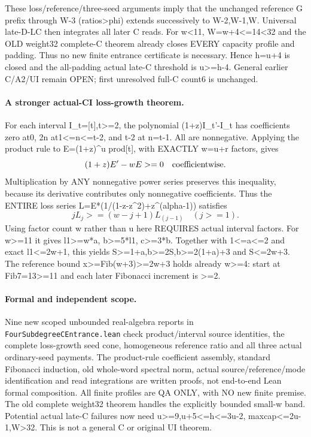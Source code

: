 These loss/reference/three-seed arguments imply that the unchanged
reference G prefix through W-3 (ratios>phi) extends successively to
W-2,W-1,W. Universal late-D-LC then integrates all later C reads.
For w<11, W=w+4<=14<32 and the OLD weight32 complete-C theorem
already closes EVERY capacity profile and padding. Thus no new finite
entrance certificate is necessary. Hence h=u+4 is closed and the
all-padding actual late-C threshold is u>=h-4. General earlier C/A2/UI
remain OPEN; first unresolved full-C count6 is unchanged.

\paragraph{A stronger actual-CI loss-growth theorem.}
For each interval I_t=[t],t>=2, the polynomial
(1+z)I_t'-I_t has coefficients zero at0, 2n at1<=n<=t-2,
and t-2 at n=t-1. All are nonnegative. Applying the product rule
to E=(1+z)^u prod[t], with EXACTLY w=u+r factors, gives
\[
 (1+z)E'-wE>=0\quad\hbox{coefficientwise}.
\]
Multiplication by ANY nonnegative power series preserves this
inequality, because its derivative contributes only nonnegative
coefficients. Thus the ENTIRE loss series
L=E*(1/(1-z-z^2)+z^(alpha-1)) satisfies
\[
 j L_j >=(w-j+1)L_(j-1)\quad(j>=1).
\]
Using factor count w rather than u here REQUIRES actual interval
factors. For w>=11 it gives l1>=w*a, b>=5*l1, c>=3*b.
Together with 1<=a<=2 and exact l1<=2w+1, this yields
S>=1+a,b>=2S,b>=2(1+a)+3 and S<=2w+3.
The reference bound x>=Fib(w+3)>=2w+3 holds already w>=4:
start at Fib7=13>=11 and each later Fibonacci increment is >=2.

\paragraph{Formal and independent scope.}
Nine new scoped unbounded real-algebra reports in
\texttt{FourSubdegreeCEntrance.lean} check product/interval source
identities, the complete loss-growth seed cone, homogeneous reference
ratio and all three actual ordinary-seed payments. The product-rule
coefficient assembly, standard Fibonacci induction, old whole-word
spectral norm, actual source/reference/mode identification and read
integrations are written proofs, not end-to-end Lean formal composition.
All finite profiles are QA ONLY, with NO new finite premise. The old
complete weight32 theorem handles the explicitly bounded small-w band.
Potential actual late-C failures now need u>=9,u+5<=h<=3u-2,
maxcap<=2u-1,W>32. This is not a general C or original UI theorem.
